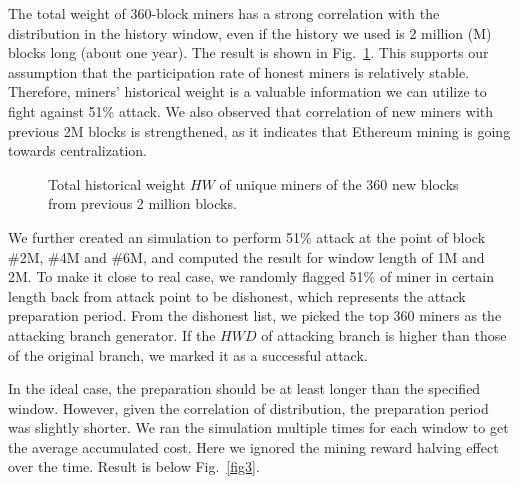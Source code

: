 \documentclass[conference]{IEEEtran}
\begin{document}
The total weight of 360-block miners has a strong correlation with the distribution in the history window, even if the history we used is 2 million (M) blocks long (about one year). The result is shown in Fig.~\ref{fig2}. This supports our assumption that the participation rate of honest miners is relatively stable. Therefore, miners' historical weight is a valuable information we can utilize to fight against 51\% attack. We also observed that correlation of new miners with previous 2M blocks is strengthened, as it indicates that Ethereum mining is going towards centralization. 

\begin{figure}[htbp]
    \caption{Total historical weight $H\!W$ of unique miners of the 360 new blocks from previous 2 million blocks.}
    \label{fig2}
    \end{figure}    
    
We further created an simulation to perform 51\% attack at the point of block \#2M, \#4M and \#6M, and computed the result for window length of 1M and 2M. To make it close to real case, we randomly flagged 51\% of miner in certain length back from attack point to be dishonest, which represents the attack preparation period. From the dishonest list, we picked the top 360 miners as the attacking branch generator. If the $H\!W\!D$ of attacking branch is higher than those of the original branch, we marked it as a successful attack. 

In the ideal case, the preparation should be at least longer than the specified window. However, given the correlation of distribution, the preparation period was slightly shorter. We ran the simulation multiple times for each window to get the average accumulated cost. Here we ignored the mining reward halving effect over the time. Result is below Fig.~\ref{fig3}.
\end{document}
